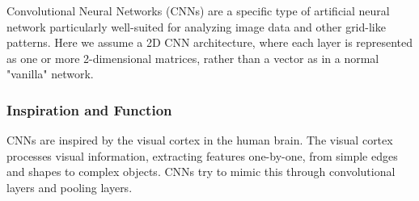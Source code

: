 \documentclass[12pt]{article}
\begin{document}
Convolutional Neural Networks (CNNs) are a specific type of artificial neural network particularly well-suited for analyzing image data and other grid-like patterns. 
Here we assume a 2D CNN architecture, where each layer is represented as one or more 2-dimensional matrices, rather than a vector as in a normal "vanilla" network.






\subsubsection*{Inspiration and Function}



CNNs are inspired by 
the visual cortex in the human brain. 
The visual cortex processes visual information, 
extracting features one-by-one, from simple edges and shapes to complex objects.
CNNs try to mimic this 
through convolutional layers and pooling layers. 


\end{document}
